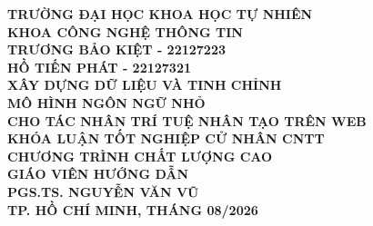 \begin{titlepage}
\titlepageframe

\begin{center}

{\bfseries TRƯỜNG ĐẠI HỌC KHOA HỌC TỰ NHIÊN\\
KHOA CÔNG NGHỆ THÔNG TIN}\\[2.5cm]

{\bfseries TRƯƠNG BẢO KIỆT - 22127223\\
HỒ TIẾN PHÁT - 22127321}\\[2.5cm]

{\large \bfseries \setlength{\baselineskip}{22pt}
XÂY DỰNG DỮ LIỆU VÀ TINH CHỈNH \\
MÔ HÌNH NGÔN NGỮ NHỎ \\
CHO TÁC NHÂN TRÍ TUỆ NHÂN TẠO TRÊN WEB}\\[2cm]

{\bfseries KHÓA LUẬN TỐT NGHIỆP CỬ NHÂN CNTT\\
CHƯƠNG TRÌNH CHẤT LƯỢNG CAO}\\[2cm]

{\bfseries GIÁO VIÊN HƯỚNG DẪN}\\
{\bfseries PGS.TS. NGUYỄN VĂN VŨ}\\[1.5cm]

\vspace*{\fill}
{\bfseries TP. HỒ CHÍ MINH, THÁNG 08/2026}\\[0.5cm]

\end{center}

\end{titlepage}
